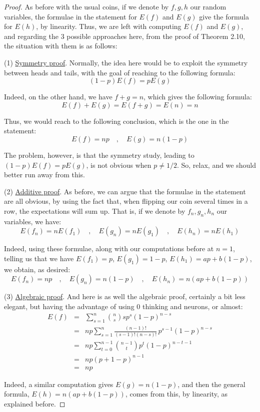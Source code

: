 \documentclass[12pt]{amsbook}
\begin{document}
\begin{proof}
As before with the usual coins, if we denote by $f,g,h$ our random variables, the formulae in the statement for $E(f)$ and $E(g)$ give the formula for $E(h)$, by linearity. Thus, we are left with computing $E(f)$ and $E(g)$, and regarding the 3 possible approaches here, from the proof of Theorem 2.10, the situation with them is as follows:

\medskip

(1) \underline{Symmetry proof}. Normally, the idea here would be to exploit the symmetry between heads and tails, with the goal of reaching to the following formula:
$$(1-p)E(f)=pE(g)$$

Indeed, on the other hand, we have $f+g=n$, which gives the following formula:
$$E(f)+E(g)=E(f+g)=E(n)=n$$

Thus, we would reach to the following conclusion, which is the one in the statement:
$$E(f)=np\quad,\quad E(g)=n(1-p)$$

The problem, however, is that the symmetry study, leading to $(1-p)E(f)=pE(g)$, is not obvious when $p\neq1/2$. So, relax, and we should better run away from this. 

\medskip

(2) \underline{Additive proof}. As before, we can argue that the formulae in the statement are all obvious, by using the fact that, when flipping our coin several times in a row, the expectations will sum up. That is, if we denote by $f_n,g_n,h_n$ our variables, we have:
$$E(f_n)=nE(f_1)\quad,\quad E(g_n)=nE(g_1)\quad,\quad E(h_n)=nE(h_1)$$

Indeed, using these formulae, along with our computations before at $n=1$, telling us that we have $E(f_1)=p$, $E(g_1)=1-p$, $E(h_1)=ap+b(1-p)$, we obtain, as desired:
$$E(f_n)=np\quad,\quad E(g_n)=n(1-p)\quad,\quad E(h_n)=n(ap+b(1-p))$$

(3) \underline{Algebraic proof}. And here is as well the algebraic proof, certainly a bit less elegant, but having the advantage of using 0 thinking and neurons, or almost:
\begin{eqnarray*}
E(f)
&=&\sum_{s=1}^n\binom{n}{s}sp^s(1-p)^{n-s}\\
&=&np\sum_{s=1}^n\frac{(n-1)!}{(s-1)!(n-s)!}\,p^{s-1}(1-p)^{n-s}\\
&=&np\sum_{t=0}^{n-1}\binom{n-1}{t}p^t(1-p)^{n-t-1}\\
&=&np(p+1-p)^{n-1}\\
&=&np
\end{eqnarray*}

Indeed, a similar computation gives $E(g)=n(1-p)$, and then the general formula, $E(h)=n(ap+b(1-p))$, comes from this, by linearity, as explained before.
\end{proof}
\end{document}
